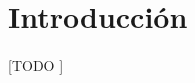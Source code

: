 \documentclass{article}
\begin{document}
	\maketitle %

	\thispagestyle{fancy} %



	\begin{abstract}
		\noindent [TODO]
	\end{abstract}



	\section{Introducción}
	\label{sec:introducción}

		\paragraph{}
		[TODO ]

	\nocite{garciparedes:machine-learning-decision-trees-and-rules}
	\nocite{subject:taa}
	\nocite{tool:weka}
  
  
\end{document}
